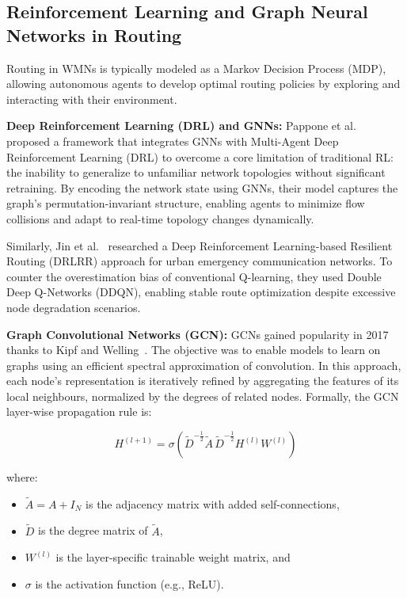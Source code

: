 \documentclass[conference]{IEEEtran}
\begin{document}
\subsection{Reinforcement Learning and Graph Neural Networks in Routing}

Routing in WMNs is typically modeled as a Markov Decision Process (MDP), allowing autonomous agents to develop optimal routing policies by exploring and interacting with their environment.

\textbf{Deep Reinforcement Learning (DRL) and GNNs:}
Pappone et al.~\cite{pappone2023} proposed a framework that integrates GNNs with Multi-Agent Deep Reinforcement Learning (DRL) to overcome a core limitation of traditional RL: the inability to generalize to unfamiliar network topologies without significant retraining. By encoding the network state using GNNs, their model captures the graph's permutation-invariant structure, enabling agents to minimize flow collisions and adapt to real-time topology changes dynamically.

Similarly, Jin et al.~\cite{jin2025} researched a Deep Reinforcement Learning-based Resilient Routing (DRLRR) approach for urban emergency communication networks. To counter the overestimation bias of conventional Q-learning, they used Double Deep Q-Networks (DDQN), enabling stable route optimization despite excessive node degradation scenarios.

\textbf{Graph Convolutional Networks (GCN):}
GCNs gained popularity in 2017 thanks to Kipf and Welling~\cite{kipf2017}. The objective was to enable models to learn on graphs using an efficient spectral approximation of convolution. In this approach, each node's representation is iteratively refined by aggregating the features of its local neighbours, normalized by the degrees of related nodes. Formally, the GCN layer-wise propagation rule is:

\begin{equation}
  H^{(l+1)} = \sigma\!\left(\tilde{D}^{-\frac{1}{2}}\tilde{A}\,\tilde{D}^{-\frac{1}{2}} H^{(l)} W^{(l)}\right)
  \label{eq:gcn}
\end{equation}

\noindent where:
\begin{itemize}
  \item $\tilde{A} = A + I_N$ is the adjacency matrix with added self-connections,
  \item $\tilde{D}$ is the degree matrix of $\tilde{A}$,
  \item $W^{(l)}$ is the layer-specific trainable weight matrix, and
  \item $\sigma$ is the activation function (e.g., ReLU).
\end{itemize}
\end{document}
